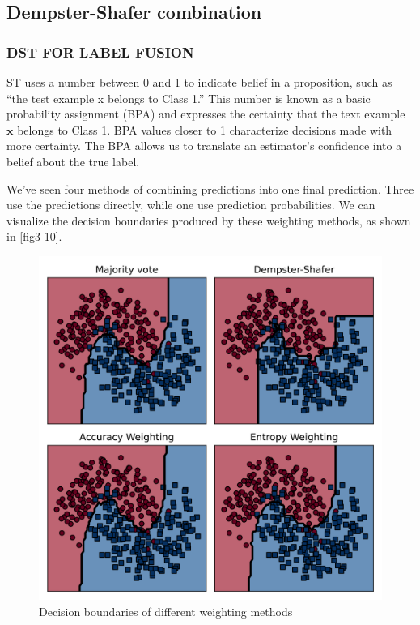 \subsection{Dempster-Shafer combination}
\subsubsection{DST FOR LABEL FUSION}
ST uses a number between 0 and 1 to indicate belief in a proposition, such as
“the test example x belongs to Class 1.” This number is known as a basic probability
assignment (BPA) and expresses the certainty that the text example $\bm{x}$ belongs to Class
1. BPA values closer to 1 characterize decisions made with more certainty. The BPA
allows us to translate an estimator’s confidence into a belief about the true label.

We’ve seen four methods of combining predictions into one final prediction. Three
use the predictions directly, while one use prediction probabilities. We can visualize the
decision boundaries produced by these weighting methods, as shown in \autoref{fig3-10}.
\begin{figure}
    \centering
    \includegraphics{../Figures/fig3-10.png}
    \caption{Decision boundaries of different weighting methods}
    \label{fig3-10}
\end{figure}